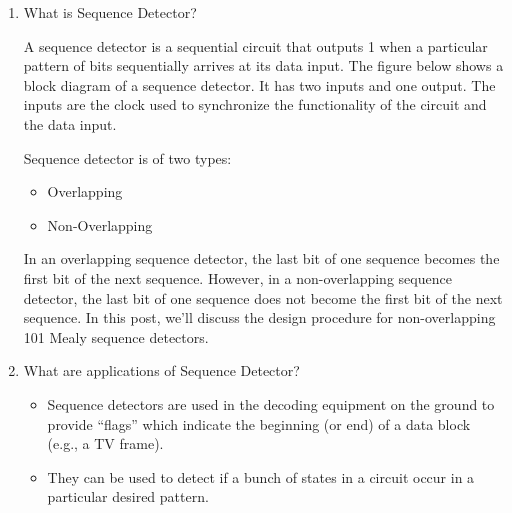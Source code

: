 \documentclass[11pt]{article}
\begin{document}
\begin{enumerate}
	\item What is Sequence Detector?

	      A sequence detector is a sequential circuit that outputs 1 when a particular pattern of bits sequentially arrives at its data input. The figure below shows a block diagram of a sequence detector. It has two inputs and one output. The inputs are the clock used to synchronize the functionality of the circuit and the data input.

	      Sequence detector is of two types:
	      \begin{itemize}
		      \item Overlapping
		      \item Non-Overlapping
	      \end{itemize}

	      In an overlapping sequence detector, the last bit of one sequence becomes the first bit of the next sequence. However, in a non-overlapping sequence detector, the last bit of one sequence does not become the first bit of the next sequence. In this post, we'll discuss the design procedure for non-overlapping 101 Mealy sequence detectors.

	\item What are applications of Sequence Detector?

	      \begin{itemize}
		      \item Sequence detectors are used in the decoding equipment on the ground to provide “flags” which indicate the beginning (or end) of a data block (e.g., a TV frame).
		      \item They can be used to detect if a bunch of states in a circuit occur in a particular desired pattern.
		      
	      \end{itemize}

\end{enumerate}
\end{document}
